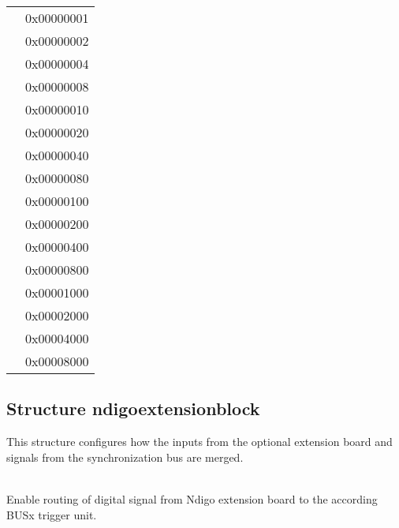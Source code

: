             \begin{xltabular}{\textwidth}{lX}
                 & 0x00000001\\
                 & 0x00000002\\
                 & 0x00000004\\
                 & 0x00000008\\
                 & 0x00000010\\
                 & 0x00000020\\
                 & 0x00000040\\
                 & 0x00000080\\
                 & 0x00000100\\
                 & 0x00000200\\
                 & 0x00000400\\
                 & 0x00000800\\
                 & 0x00001000\\
                 & 0x00002000\\
                 & 0x00004000\\
                 & 0x00008000
            \end{xltabular}


        \subsection{Structure ndigo\tu extension\tu block}
            This structure configures how the inputs from the optional extension board and signals from the synchronization bus are merged.\par

            \\
            Enable routing of digital signal from Ndigo extension board to the according BUSx trigger unit.\par

